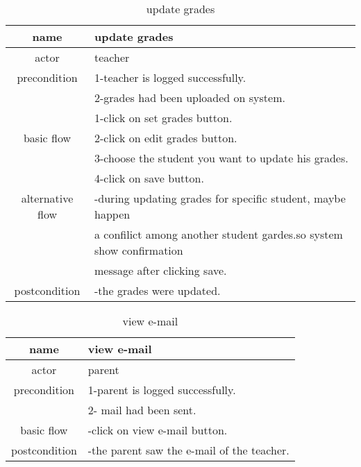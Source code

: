 \documentclass{article}
\begin{document}
    \begin{table}
    	\centering
    	\label{update grades}
    	\caption{update grades}
    	\begin{tabular}{|c|l|}
    		\hline
    		name & update grades\\
    		\hline
    		actor & teacher\\
    		\hline
    		precondition & 1-teacher is logged successfully.\\
    		&2-grades had been uploaded on system.\\
    		\hline
    		& 1-click on set grades button.\\
    		basic flow &2-click on edit grades button.\\
    		&3-choose the student you want to update his grades.\\
    		&4-click on save button. \\
    		\hline
    		alternative flow & -during updating grades for specific student,  maybe happen\\ &a confilict among another student gardes.so system show confirmation\\& message after clicking save.\\
    		\hline
    		postcondition & -the grades were updated.\\
    		\hline    
    	\end{tabular}
    \end{table}
    \begin{table}
    	\centering
    	\label{view e-mail}
    	\caption{view e-mail}
    	\begin{tabular}{|c|l|}
    		\hline
    		name & view e-mail\\
    		\hline
    		actor & parent\\
    		\hline
    		precondition & 1-parent is logged successfully.\\
    		&2- mail had been sent.\\
    		\hline
    		basic flow & -click on view e-mail button.\\
    		\hline
    		postcondition & -the parent saw the e-mail of the teacher.\\    
    		\hline
    	\end{tabular}
    \end{table}
    
\end{document}
